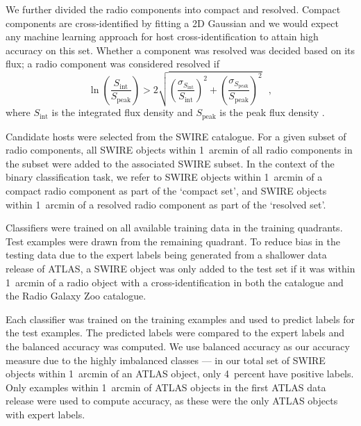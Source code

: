 \documentclass[fleqn,usenatbib,usedcolumn]{mnras}
\begin{document}
    We further divided the radio components into compact and resolved. Compact
    components are cross-identified by fitting a 2D Gaussian \citep[as
    in][]{norris06} and we would expect any machine learning approach for host
    cross-identification to attain high accuracy on this set. Whether a
    component was resolved was decided based on its flux; a radio component was
    considered resolved if
    \begin{equation}
        \ln \left(
          \frac{S_{\text{int}}}
               {S_{\text{peak}}}
        \right) > 2\sqrt{\left(
          \frac{\sigma_{S_{\text{int}}}}
               {S_{\text{int}}}
        \right)^2 + \left(
          \frac{\sigma_{S_{\text{peak}}}}
               {S_{\text{peak}}}
        \right)^2}\,\,\,\,,
    \end{equation}%
    where \(S_{\text{int}}\) is the integrated flux density and
    \(S_{\text{peak}}\) is the peak flux density
    \citep[following][]{franzen15}.

    Candidate hosts were selected from the SWIRE catalogue. For a given subset
    of radio components, all SWIRE objects within 1~arcmin of all radio
    components in the subset were added to the associated SWIRE subset. In the
    context of the binary classification task, we refer to SWIRE objects
    within 1~arcmin of a compact radio component as part of the `compact set',
    and SWIRE objects within 1~arcmin of a resolved radio component as part of
    the `resolved set'.

    Classifiers were trained on all available training data in the training
    quadrants. Test examples were drawn from the remaining quadrant. To reduce
    bias in the testing data due to the expert labels being generated from a
    shallower data release of ATLAS, a SWIRE object was only added to the test
    set if it was within 1~arcmin of a radio object with a cross-identification
    in both the \citet{norris06} catalogue and the Radio Galaxy Zoo catalogue.

    Each classifier was trained on the training examples and used to predict
    labels for the test examples. The predicted labels were compared to the
    expert labels and the balanced accuracy was computed. We use balanced
    accuracy as our accuracy measure due to the highly imbalanced classes --- in
    our total set of SWIRE objects within 1~arcmin of an ATLAS object, only
    4~percent have positive labels. Only examples within 1~arcmin of ATLAS
    objects in the first ATLAS data release \citep{norris06} were used to
    compute accuracy, as these were the only ATLAS objects with expert labels.
\end{document}
